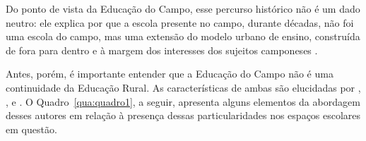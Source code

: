 \documentclass[
  12pt,
  openright,
  twoside,
  a4paper,
  english,
  brazilian,
  sumario=tradicional
]{abntex2}
\begin{document}
Do ponto de vista da Educação do Campo, esse percurso histórico não é um dado neutro: ele explica por que a escola presente no campo, durante décadas, não foi uma escola do campo, mas uma extensão do modelo urbano de ensino, construída de fora para dentro e à margem dos interesses dos sujeitos camponeses \cite{caldart2009,antunesrocha2014}.

Antes, porém, é importante entender que a Educação do Campo não é uma continuidade da Educação Rural. As características de ambas são elucidadas por , ,  e . O Quadro~\ref{qua:quadro1}, a seguir, apresenta alguns elementos da abordagem desses autores em relação à presença dessas particularidades nos espaços escolares em questão.
\end{document}

